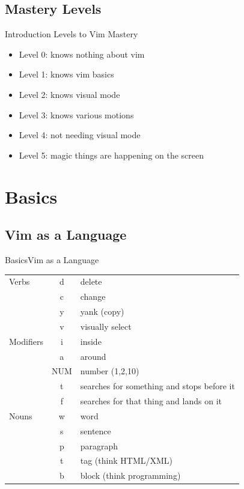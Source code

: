 \documentclass{beamer}
\begin{document}
\subsection{Mastery Levels}
\begin{frame} {Introduction} {Levels to Vim Mastery}
    \begin{itemize}
        \item Level 0: knows nothing about vim \\
        \item Level 1: knows vim basics \\
        \item Level 2: knows visual mode \\
        \item Level 3: knows various motions \\
        \item Level 4: not needing visual mode \\
        \item Level 5: magic things are happening on the screen \\
    \end{itemize}
\end{frame}


\section{Basics}

\subsection{Vim as a Language}
\begin{frame}[c]{Basics}{Vim as a Language}
\begin{table}
    \centering
    \label{tab:label}
    \begin{tabular}{l|c|l}
        Verbs     & d   & delete \\
                  & c   & change           \\
                  & y   & yank (copy)      \\
                  & v   & visually select  \\
        \hline
        Modifiers & i   & inside \\
                  & a   & around \\
                  & NUM & number (1,2,10) \\
                  & t   & searches for something and stops before it \\
                  & f   & searches for that thing and lands on it \\
        \hline
        Nouns     & w   & word \\
                  & s   & sentence \\
                  & p   & paragraph \\
                  & t   & tag (think HTML/XML) \\
                  & b   & block (think programming) \\
    \end{tabular}
\end{table}
\end{frame}
\end{document}
